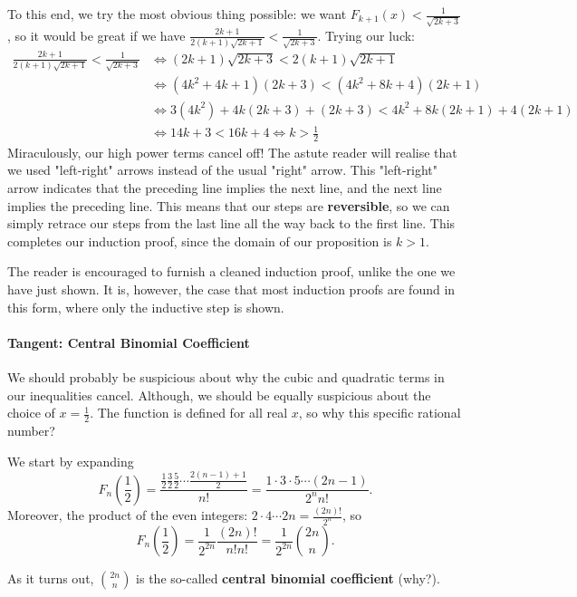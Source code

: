 \documentclass[../main.tex]{subfiles}
\begin{document}
    To this end, we try the most obvious thing possible: we want $F_{k+1}(x) < \frac{1}{\sqrt{2k+3}}$, so it would be great if we have $\frac{2k+1}{2(k+1)\sqrt{2k+1}}<\frac{1}{\sqrt{2k+3}}$. Trying our luck:
    \begin{align*}
        \frac{2k+1}{2(k+1)\sqrt{2k+1}} < \frac{1}{\sqrt{2k+3}}
        &\Longleftrightarrow (2k+1)\sqrt{2k+3} < 2(k+1)\sqrt{2k+1} \\
        &\Longleftrightarrow (4k^2+4k+1)(2k+3) < (4k^2+8k+4)(2k+1) \\
        &\Longleftrightarrow 3(4k^2)+4k(2k+3)+(2k+3) < 4k^2+8k(2k+1)+4(2k+1) \\
        &\Longleftrightarrow 14k+3 < 16k+4 \Longleftrightarrow k > \frac{1}{2}
    \end{align*}
    Miraculously, our high power terms cancel off! The astute reader will realise that we used "left-right" arrows instead of the usual "right" arrow. This "left-right" arrow indicates that the preceding line implies the next line, and the next line implies the preceding line. This means that our steps are \textbf{reversible}, so we can simply retrace our steps from the last line all the way back to the first line. This completes our induction proof, since the domain of our proposition is $k > 1$.

    The reader is encouraged to furnish a cleaned induction proof, unlike the one we have just shown. It is, however, the case that most induction proofs are found in this form, where only the inductive step is shown.
    \paragraph{Tangent: Central Binomial Coefficient}\label{algebra-cbc}
    We should probably be suspicious about why the cubic and quadratic terms in our inequalities cancel. Although, we should be equally suspicious about the choice of $x=\frac{1}{2}$. The function is defined for all real $x$, so why this specific rational number?
    
    We start by expanding $$F_n\left(\frac{1}{2}\right)=\frac{\frac{1}{2}\frac{3}{2}\frac{5}{2}\cdots\frac{2(n-1)+1}{2}}{n!}=\frac{1\cdot3\cdot5\cdots(2n-1)}{2^nn!}.$$
    Moreover, the product of the even integers: $2\cdot4\cdots2n=\frac{(2n)!}{2^n}$, so $$F_n\left(\frac{1}{2}\right)=\frac{1}{2^{2n}}\frac{(2n)!}{n!n!}=\frac{1}{2^{2n}}\binom{2n}{n}.$$
    
    As it turns out, $\binom{2n}{n}$ is the so-called \textbf{central binomial coefficient} (why?).
    
\end{document}
